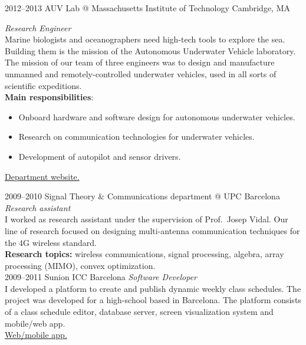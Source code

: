 \documentclass[]{friggeri-cv} %
\begin{document}
\begin{entrylist}
\entry
{2012--2013}
{AUV Lab @ Massachusetts Institute of Technology}
{Cambridge, MA}
{%
\emph{Research Engineer} \\
Marine biologists and oceanographers need high-tech tools to explore the sea.
Building them is the mission of the Autonomous Underwater Vehicle laboratory.
The mission of our team of three engineers was to design and manufacture unmanned
and remotely-controlled underwater vehicles, used in all sorts of scientific expeditions.\\
{\bf Main responsibilities}:
  \begin{itemize}
    \item Onboard hardware and software design for autonomous
      underwater vehicles.
    \item Research on communication technologies for underwater
      vehicles.
    \item Development of autopilot and sensor drivers.
  \end{itemize}
\href{http://seagrant.mit.edu}{{\FA\faExternalLink} Department website.}
}

\end{entrylist}
\begin{entrylist}


\entry
{2009--2010}
{Signal Theory \& Communications department @ UPC}
{Barcelona}
{%
\emph{Research assistant} \\
I worked as research assistant under the supervision of Prof.\ Josep
Vidal. Our line of research focused on designing multi-antenna communication
techniques for the 4G wireless standard. \\
{\bf Research topics:} wireless communications, signal processing,
algebra, array processing (MIMO), convex optimization.
}\\


\entry
{2009--2011}
{Sunion ICC}
{Barcelona}
{%
\emph{Software Developer} \\
I developed a platform to create and publish dynamic weekly class schedules.
The project was developed for a high-school based in Barcelona. The platform
consists of a class schedule editor, database server, screen visualization
system and mobile/web app. \\
\href{http://horari.sunion.net}{{\FA\faExternalLink} Web/mobile app.}
}


\end{entrylist}
\end{document}
